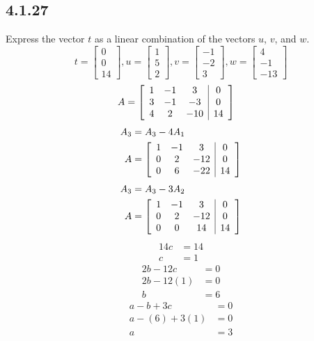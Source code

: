 \documentclass{article}
\begin{document}
\subsection{4.1.27}
Express the vector $ t $ as a linear combination of the vectors $ u $, $ v $, and $ w $.
\begin{equation*}
	t = \begin{bmatrix} 0 \\ 0 \\ 14 \end{bmatrix},
	u = \begin{bmatrix} 1 \\ 5 \\ 2 \end{bmatrix},
	v = \begin{bmatrix} -1 \\ -2 \\ 3 \end{bmatrix},
	w = \begin{bmatrix} 4 \\ -1 \\ -13 \end{bmatrix}
\end{equation*}
\begin{align*}
	A & = \left[ \begin{array}{c c c | c}
		1 & -1 & 3 & 0 \\
		3 & -1 & -3 & 0 \\
		4 & 2 & -10 & 14
	\end{array} \right]
\end{align*}
\begin{align*}
	A_3 & = A_3 - 4A_1 \\
	A & = \left[ \begin{array}{c c c | c}
		1 & -1 & 3 & 0 \\
		0 & 2 & -12 & 0 \\
		0 & 6 & -22 & 14
	\end{array} \right]
\end{align*}
\begin{align*}
	A_3 & = A_3 - 3A_2 \\
	A & = \left[ \begin{array}{c c c | c}
		1 & -1 & 3 & 0 \\
		0 & 2 & -12 & 0 \\
		0 & 0 & 14 & 14
	\end{array} \right]
\end{align*}
\begin{align*}
	14c & = 14 \\
	c & = 1
\end{align*}
\begin{align*}
	2b - 12c & = 0 \\
	2b - 12(1) & = 0 \\
	b & = 6
\end{align*}
\begin{align*}
	a - b + 3c & = 0 \\
	a - (6) + 3(1) & = 0 \\
	a & = 3
\end{align*}
\end{document}
